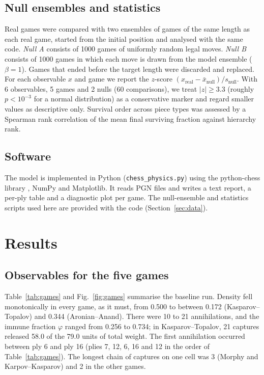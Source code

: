 \documentclass[11pt,a4paper]{article}
\begin{document}
\subsection{Null ensembles and statistics}
Real games were compared with two ensembles of games of the same length as each real game, started from the initial position and analysed with the same code. \emph{Null A} consists of 1000 games of uniformly random legal moves. \emph{Null B} consists of 1000 games in which each move is drawn from the model ensemble ($\beta=1$). Games that ended before the target length were discarded and replaced. For each observable $x$ and game we report the $z$-score $(x_{\mathrm{real}}-\bar x_{\mathrm{null}})/s_{\mathrm{null}}$. With 6 observables, 5 games and 2 nulls (60 comparisons), we treat $|z|\ge 3.3$ (roughly $p<10^{-3}$ for a normal distribution) as a conservative marker and regard smaller values as descriptive only. Survival order across piece types was assessed by a Spearman rank correlation of the mean final surviving fraction against hierarchy rank.

\subsection{Software}
The model is implemented in Python (\texttt{chess\_physics.py}) using the python-chess library \citep{fiekas2025}, NumPy and Matplotlib. It reads PGN files and writes a text report, a per-ply table and a diagnostic plot per game. The null-ensemble and statistics scripts used here are provided with the code (Section~\ref{sec:data}).

\section{Results}\label{sec:results}

\subsection{Observables for the five games}
Table~\ref{tab:games} and Fig.~\ref{fig:games} summarise the baseline run. Density fell monotonically in every game, as it must, from 0.500 to between 0.172 (Kasparov--Topalov) and 0.344 (Aronian--Anand). There were 10 to 21 annihilations, and the immune fraction $\varphi$ ranged from 0.256 to 0.734; in Kasparov--Topalov, 21 captures released 58.0 of the 79.0 units of total weight. The first annihilation occurred between ply 6 and ply 16 (plies 7, 12, 6, 16 and 12 in the order of Table~\ref{tab:games}). The longest chain of captures on one cell was 3 (Morphy and Karpov--Kasparov) and 2 in the other games.
\end{document}
